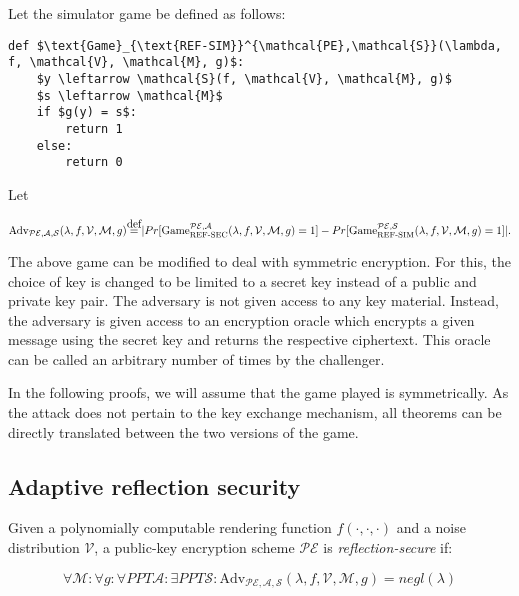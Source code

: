 \documentclass{article}
\newcommand\defeq{\stackrel{\mathclap{\normalfont\mbox{def}}}{=}}
\begin{document}
Let the simulator game be defined as follows:

\begin{lstlisting}[texcl,mathescape]
def $\text{Game}_{\text{REF-SIM}}^{\mathcal{PE},\mathcal{S}}(\lambda, f, \mathcal{V}, \mathcal{M}, g)$:
    $y \leftarrow \mathcal{S}(f, \mathcal{V}, \mathcal{M}, g)$
    $s \leftarrow \mathcal{M}$
    if $g(y) = s$:
        return 1
    else:
        return 0
\end{lstlisting}

Let

\begin{equation*}
    \text{Adv}_{\mathcal{PE}, \mathcal{A}, \mathcal{S}}(\lambda, f, \mathcal{V}, \mathcal{M}, g)
    \defeq
    |Pr[\text{Game}_{\text{REF-SEC}}^{\mathcal{PE},\mathcal{A}}(\lambda, f, \mathcal{V}, \mathcal{M}, g) = 1]
    -
    Pr[\text{Game}_{\text{REF-SIM}}^{\mathcal{PE},\mathcal{S}}(\lambda, f, \mathcal{V}, \mathcal{M}, g) = 1]|.
\end{equation*}

The above game can be modified to deal with symmetric encryption. For this,
the choice of key is changed to be limited to a secret key instead of a public and private key
pair. The adversary is not given access to any key material. Instead,
the adversary is given access to an encryption oracle which encrypts a given message
using the secret key and returns the respective ciphertext. This oracle can be
called an arbitrary number of times by the challenger.

In the following proofs, we will assume that the game
played is symmetrically. As the attack does not pertain to the key exchange mechanism,
all theorems can be directly translated between the two versions of the game.

\subsection{Adaptive reflection security}

Given a polynomially computable rendering function $f(\cdot, \cdot, \cdot)$ and
a  noise distribution $\mathcal{V}$, a public-key encryption scheme
$\mathcal{PE}$ is \textit{reflection-secure} if:

\begin{equation*}
\forall \mathcal{M}:
\forall g:
\forall PPT \mathcal{A}:
\exists PPT \mathcal{S}:
\text{Adv}_{\mathcal{PE}, \mathcal{A}, \mathcal{S}}(\lambda, f, \mathcal{V}, \mathcal{M}, g) = negl(\lambda)
\end{equation*}
\end{document}
